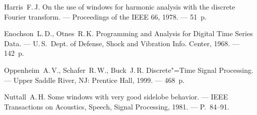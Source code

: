\documentclass{thesis_utf8}
\begin{document}
\begin{thebibliography}
    Harris~F.\,J. On the use of windows for harmonic analysis with the discrete Fourier transform. --- Proceedings of
    the IEEE 66, 1978. --- 51~p.

    Enochson~L.\,D., Otnes~R.\,K. Programming and Analysis for Digital Time Series Data. --- U.\,S.~Dept. of Defense,
    Shock and Vibration Info. Center, 1968. --- 142~p.

    Oppenheim~A.\,V., Schafer~R.\,W., Buck~J.\,R. Discrete"=Time Signal Processing. --- Upper Saddle River, NJ:
    Prentice Hall, 1999. --- 468~p.

    Nuttall~A.\,H. Some windows with very good sidelobe behavior. --- IEEE Transactions on Acoustics, Speech, Signal
    Processing, 1981. --- P.~84--91.
\end{thebibliography}








\end{document}
